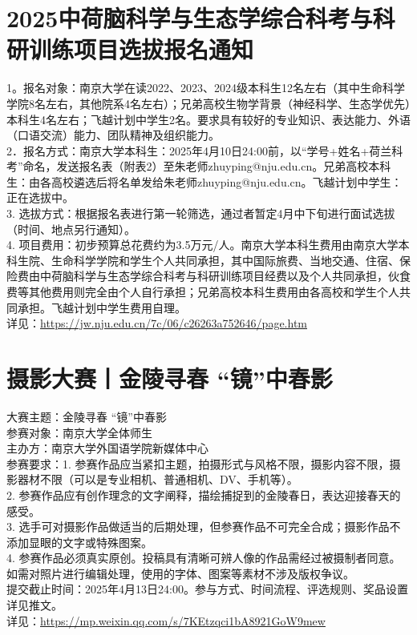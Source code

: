 \documentclass[letterpaper, 12pt]{article}
\begin{document}
\begin{multicols}{2}
\section{2025中荷脑科学与生态学综合科考与科研训练项目选拔报名通知}
1。报名对象：南京大学在读2022、2023、2024级本科生12名左右（其中生命科学学院8名左右，其他院系4名左右）；兄弟高校生物学背景（神经科学、生态学优先）本科生4名左右；飞越计划中学生2名。要求具有较好的专业知识、表达能力、外语（口语交流）能力、团队精神及组织能力。
\\2．报名方式：南京大学本科生：2025年4月10日24:00前，以“学号+姓名+荷兰科考”命名，发送报名表（附表2）至朱老师zhuyping@nju.edu.cn。兄弟高校本科生：由各高校遴选后将名单发给朱老师zhuyping@nju.edu.cn。飞越计划中学生：正在选拔中。
\\3. 选拔方式：根据报名表进行第一轮筛选，通过者暂定4月中下旬进行面试选拔（时间、地点另行通知）。
\\4. 项目费用：初步预算总花费约为3.5万元/人。南京大学本科生费用由南京大学本科生院、生命科学学院和学生个人共同承担，其中国际旅费、当地交通、住宿、保险费由中荷脑科学与生态学综合科考与科研训练项目经费以及个人共同承担，伙食费等其他费用则完全由个人自行承担；兄弟高校本科生费用由各高校和学生个人共同承担。飞越计划中学生费用自理。
\\详见：\url{https://jw.nju.edu.cn/7c/06/c26263a752646/page.htm}


\section{摄影大赛丨金陵寻春 “镜”中春影}
大赛主题：金陵寻春 “镜”中春影
\\参赛对象：南京大学全体师生
\\主办方：南京大学外国语学院新媒体中心
\\参赛要求：1. 参赛作品应当紧扣主题，拍摄形式与风格不限，摄影内容不限，摄影器材不限（可以是专业相机、普通相机、DV、手机等）。
\\2. 参赛作品应有创作理念的文字阐释，描绘捕捉到的金陵春日，表达迎接春天的感受。
\\3. 选手可对摄影作品做适当的后期处理，但参赛作品不可完全合成；摄影作品不添加显眼的文字或特殊图案。
\\4. 参赛作品必须真实原创。投稿具有清晰可辨人像的作品需经过被摄制者同意。如需对照片进行编辑处理，使用的字体、图案等素材不涉及版权争议。
\\提交截止时间：2025年4月13日24:00。参与方式、时间流程、评选规则、奖品设置详见推文。
\\详见：\url{https://mp.weixin.qq.com/s/7KEtzqci1bA8921GoW9mew}


\end{multicols}
\end{document}
